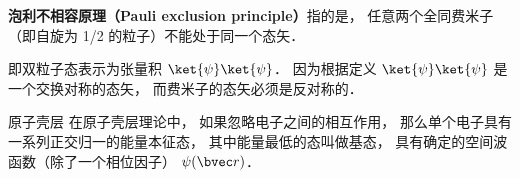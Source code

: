 
\textbf{泡利不相容原理（Pauli exclusion principle）}指的是， 任意两个全同费米子（即自旋为 1/2 的粒子）不能处于同一个态矢．

即双粒子态表示为张量积 $\ket{\psi}\ket{\psi}$． 因为根据定义 $\ket{\psi}\ket{\psi}$ 是一个交换对称的态矢， 而费米子的态矢必须是反对称的．

\begin{example}{原子壳层}
在原子壳层理论中， 如果忽略电子之间的相互作用， 那么单个电子具有一系列正交归一的能量本征态， 其中能量最低的态叫做基态， 具有确定的空间波函数（除了一个相位因子） $\psi(\bvec r)$． 
\end{example}
